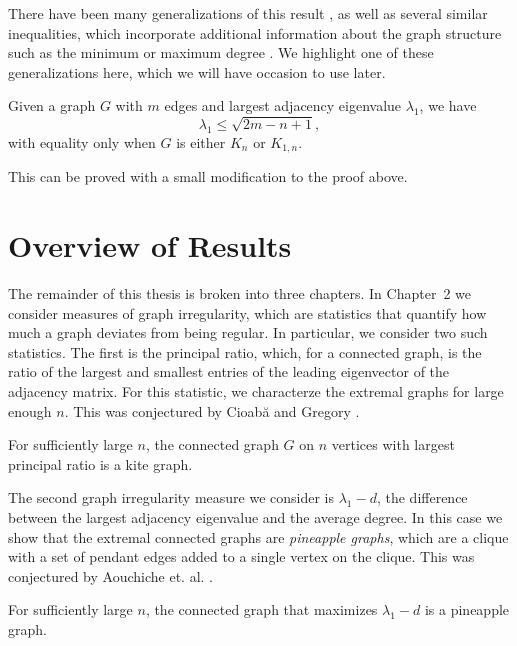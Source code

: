 There have been many generalizations of this result \cite{Friedland1988, Hong1988, HongEtAl2001, Nikiforov2002, DasKumar2004},
as well as several
similar inequalities, which incorporate additional information about the graph structure
such as the minimum or maximum degree \cite{FavaronMaheoSacle1993, BermanZhang2001, Nikiforov2006Walks}.  We highlight one of these generalizations here, which we will have occasion to use later.

\begin{theorem}
  Given a graph $G$ with $m$ edges and largest adjacency eigenvalue $\lambda_1$, we have
  \[ \lambda_1 \leq \sqrt{2m - n + 1} ,\]
  with equality only when $G$ is either $K_n$ or $K_{1,n}$.
\end{theorem}
\noindent This can be proved with a small modification to the proof above.  


\section{Overview of Results}

The remainder of this thesis is broken into three chapters.  In Chapter~2 we consider
measures of graph irregularity, which are statistics that quantify how much a graph deviates
from being regular.
In particular, we consider two such statistics. The first is the principal ratio, which,
for a connected graph, is the ratio of the largest and smallest entries of the leading
eigenvector of the adjacency matrix.  For this statistic, we characterze the extremal
graphs for large enough $n$.  This was conjectured by Cioab\u{a} and Gregory
\cite{CioabaGregory2007}.
\begin{theorem}
  For sufficiently large $n$, the connected graph $G$ on $n$
  vertices with largest principal ratio is a kite graph.
\end{theorem}
\noindent The second graph irregularity measure we consider is  $\lambda_1 - d$,
the difference between the largest adjacency eigenvalue and the average degree.
In this case we show that the extremal connected graphs are \textit{pineapple graphs}, which
are a clique with a set of pendant edges added to a single vertex on the clique.
This was conjectured by Aouchiche et. al. \cite{AouchicheEtAl2008}.
\begin{theorem}
  For sufficiently large $n$, the connected graph that maximizes $\lambda_1 - d$
  is a pineapple graph.
\end{theorem}




